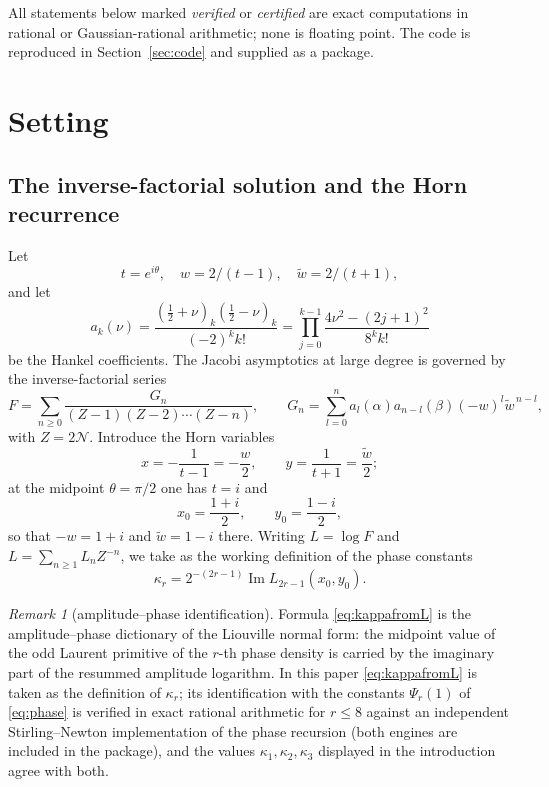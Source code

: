 \documentclass[12pt]{amsart}
\theoremstyle{definition}
\theoremstyle{remark}
\newtheorem{remark}[theorem]{Remark}
\newcommand{\Nn}{\mathcal N}
\begin{document}
All statements below marked \emph{verified} or \emph{certified} are exact computations in rational or Gaussian-rational arithmetic; none is floating point.  The code is reproduced in Section~\ref{sec:code} and supplied as a package.

\section{Setting}\label{sec:setting}

\subsection{The inverse-factorial solution and the Horn recurrence}

Let 
\[
t=e^{i\theta}, \quad w=2/(t-1), \quad \widetilde w=2/(t+1), 
\]
and let
\[
  a_k(\nu)=\frac{(\frac12+\nu)_k(\frac12-\nu)_k}{(-2)^kk!} =\prod_{j=0}^{k-1}\frac{4\nu^2-(2j+1)^2}{8^kk!}
\]
be the Hankel coefficients.  The Jacobi asymptotics at large degree is governed by the inverse-factorial series
\begin{equation}\label{eq:invfact}
  F=\sum_{n\ge0}\frac{G_n}{(Z-1)(Z-2)\cdots(Z-n)},\qquad   G_n=\sum_{l=0}^na_l(\alpha)a_{n-l}(\beta)(-w)^l\widetilde w^{\,n-l},
\end{equation}
with $Z=2\Nn$.  Introduce the Horn variables
\[
  x=-\frac1{t-1}=-\frac w2,\qquad y=\frac1{t+1}=\frac{\widetilde w}2 ;
\]
at the midpoint $\theta=\pi/2$ one has $t=i$ and
\[
  x_0=\frac{1+i}2,\qquad y_0=\frac{1-i}2 ,
\]
so that $-w=1+i$ and $\widetilde w=1-i$ there.  Writing $L=\log F$ and $L=\sum_{n\ge1}L_nZ^{-n}$, we take as the working definition of the phase constants
\begin{equation}\label{eq:kappafromL}
  \kappa_r=2^{-(2r-1)}\operatorname{Im}L_{2r-1}(x_0,y_0).
\end{equation}

\begin{remark}[amplitude--phase identification]\label{rem:identification}
Formula \eqref{eq:kappafromL} is the amplitude--phase dictionary of the Liouville normal form: the midpoint value of the odd Laurent primitive of the $r$-th phase density is carried by the imaginary part of the resummed amplitude logarithm.  In this paper \eqref{eq:kappafromL} is taken as the definition of $\kappa_r$; its identification with the constants $\Psi_r(1)$ of \eqref{eq:phase} is verified in exact rational arithmetic for $r\le8$ against an independent Stirling--Newton implementation of the phase recursion (both engines are included in the package), and the values $\kappa_1,\kappa_2,\kappa_3$ displayed in the introduction agree with both.
\end{remark}
\end{document}
